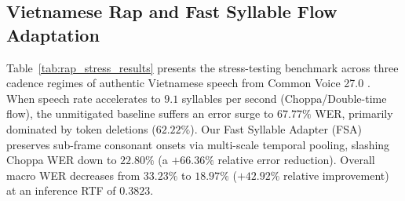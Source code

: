 \subsection{Vietnamese Rap and Fast Syllable Flow Adaptation}
Table~\ref{tab:rap_stress_results} presents the stress-testing benchmark across three cadence regimes of authentic Vietnamese speech from Common Voice 27.0 \cite{ardila2020common}. When speech rate accelerates to $9.1$ syllables per second (Choppa/Double-time flow), the unmitigated baseline suffers an error surge to $67.77\%$ WER, primarily dominated by token deletions ($62.22\%$). Our Fast Syllable Adapter (FSA) preserves sub-frame consonant onsets via multi-scale temporal pooling, slashing Choppa WER down to $22.80\%$ (a $+66.36\%$ relative error reduction). Overall macro WER decreases from $33.23\%$ to $18.97\%$ ($+42.92\%$ relative improvement) at an inference RTF of $0.3823$.

\begin{table}[t]
\centering
\caption{Empirical stress-testing performance of the Fast Syllable Adapter (FSA) across high-tempo flow tiers (18 items, 27.51s audio).}
\label{tab:rap_stress_results}
\end{table}

